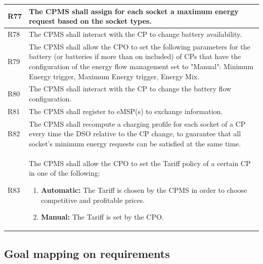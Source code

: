 \documentclass{Configuration_Files/PoliMi3i_thesis}
\begin{document}
\begin{xltabular}{\textwidth}{| >{}l | X |}
R77 &
    The CPMS shall assign for each socket a maximum energy request based on the socket types.\B\\
\hline

R78 &
    The CPMS shall interact with the CP to change battery availability.\B\\
\hline

R79 &
    The CPMS shall allow the CPO to set the following  parameters for the battery (or batteries if more than on included) of CPs that have the configuration of the energy flow management set to  "Manual": Minimum Energy trigger, Maximum Energy trigger, Energy Mix.\B\\
\hline

R80 &
    The CPMS shall interact with the CP to change the battery flow configuration.\B\\
\hline

R81 &
    The CPMS shall register to eMSP(s) to exchange information.\B\\
\hline

R82 &
    The CPMS shall recompute a charging profile for each socket of a CP every time the DSO relative to the CP change, to guarantee that all socket's minimum energy requests can be satisfied at the same time.\B\\
\hline

R83 &
    The CPMS shall allow the CPO to set the Tariff policy of a certain CP in one of the following:
    \begin{enumerate}
        \item \textbf{Automatic:} The Tariff is chosen by the CPMS in order to choose competitive and profitable prices.   
        \item\textbf{Manual:} The Tariff is set by the CPO. 
    \end{enumerate}\B\\
\hline
\end{xltabular}

\subsection{Goal mapping on requirements}
\end{document}
